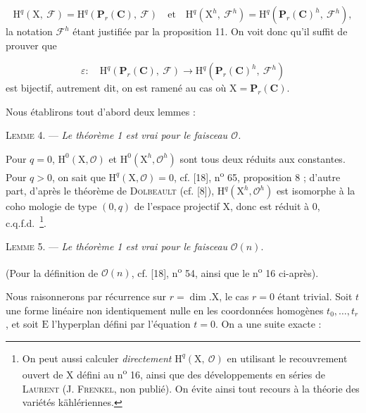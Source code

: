 \begin{equation*}
\mathrm{H}^q(\mathrm{X},\ \mathcal{F}) = \mathrm{H}^q(\mathbf{P}_r(\mathbf{C}),\ \mathcal{F}) \quad \mathrm{et} \quad \mathrm{H}^q(\mathrm{X}^h,\ \mathcal{F}^h) = \mathrm{H}^q(\mathbf{P}_r(\mathbf{C})^h,\ \mathcal{F}^h),
\end{equation*}
la notation $\mathcal{F}^h$ étant justifiée par la proposition 11. On voit donc qu'il suffit de prouver que

\begin{equation*}
\varepsilon : \quad \mathrm{H}^q(\mathbf{P}_r(\mathbf{C}),\ \mathcal{F}) \longrightarrow \mathrm{H}^q(\mathbf{P}_r(\mathbf{C})^h,\ \mathcal{F}^h)
\end{equation*}
est bijectif, autrement dit, on est ramené au cas où $\mathrm{X} = \mathbf{P}_r(\mathbf{C})$.

Nous établirons tout d'abord deux lemmes :

\textsc{Lemme} 4. --- \textit{Le théorème 1 est vrai pour le faisceau $\mathcal{O}$.}

Pour $q = 0$, $\mathrm{H}^0(\mathrm{X}, \mathcal{O})$ et $\mathrm{H}^0(\mathrm{X}^h, \mathcal{O}^h)$ sont tous deux réduits aux constantes. Pour $q > 0$, on sait que $\mathrm{H}^q(\mathrm{X}, \mathcal{O}) = 0$, cf. [18], n\textsuperscript{o} 65, proposition 8 ; d'autre part, d'après le théorème de \textsc{Dolbeault} (cf. [8]), $\mathrm{H}^q(\mathrm{X}^h, \mathcal{O}^h)$ est isomorphe à la coho%
mologie de type $(0, q)$ de l'espace projectif $\mathrm{X}$, donc est réduit à $0$, c.q.f.d.\ \footnote{On peut aussi calculer \textit{directement} $\mathrm{H}^{q}(\mathrm{X},\ \mathcal{O})$ en utilisant le recouvrement ouvert de $\mathrm{X}$ défini au n\textsuperscript{o} 16, ainsi que des développements en séries de \textsc{Laurent} (J. \textsc{Frenkel}, non publié). On évite ainsi tout recours à la théorie des variétés kählériennes.}.

\textsc{Lemme} 5. — \textit{Le théorème 1 est vrai pour le faisceau} $\mathcal{O}(n)$.

(Pour la définition de $\mathcal{O}(n)$, cf. [18], n\textsuperscript{o} 54, ainsi que le n\textsuperscript{o} 16 ci-après).

Nous raisonnerons par récurrence sur $r = \dim. \mathrm{X}$, le cas $r = 0$ étant trivial. Soit $t$ une forme linéaire non identiquement nulle en les coordonnées homogènes $t_0, \ldots, t_r$, et soit $\mathrm{E}$ l'hyperplan défini par l'équation $t = 0$. On a une suite exacte :

